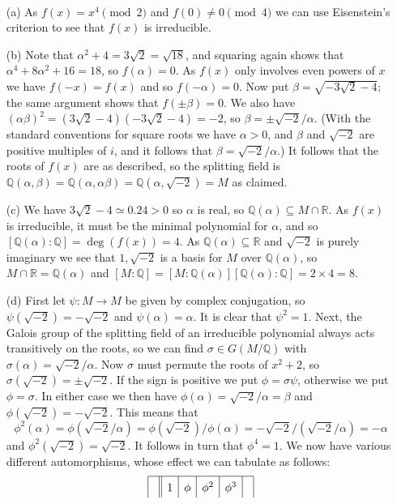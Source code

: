 \documentclass{amsart}
\newcommand{\Q}         {{\mathbb{Q}}}
\newcommand{\R}         {{\mathbb{R}}}
\newcommand{\al}        {\alpha}
\newcommand{\bt}        {\beta}
\newcommand{\sg}        {\sigma}
\newcommand{\tm}        {\times}
\newcommand{\sse}       {\subseteq}
\renewcommand{\:}{\colon}
\newenvironment{solution}{\SolutionInline}{\endSolutionInline}
\theoremstyle{definition}
\renewenvironment{solution}{\SolutionAtEnd}{\endSolutionAtEnd}
\begin{document}
\begin{solution}\ \\
 \begin{itemize}
  \item[(a)] As $f(x)=x^4\pmod{2}$ and $f(0)\neq 0\pmod{4}$ we can use
   Eisenstein's criterion to see that $f(x)$ is irreducible.
  \item[(b)] Note that $\al^2+4=3\sqrt{2}=\sqrt{18}$, and squaring
   again shows that $\al^4+8\al^2+16=18$, so $f(\al)=0$.  As $f(x)$
   only involves even powers of $x$ we have $f(-x)=f(x)$ and so
   $f(-\al)=0$.  Now put $\bt=\sqrt{-3\sqrt{2}-4}$; the same argument
   shows that $f(\pm\bt)=0$.  We also have
   $(\al\bt)^2=(3\sqrt{2}-4)(-3\sqrt{2}-4)=-2$, so
   $\bt=\pm\sqrt{-2}/\al$.  (With the standard conventions for square
   roots we have $\al>0$, and $\bt$ and $\sqrt{-2}$ are positive
   multiples of $i$, and it follows that $\bt=\sqrt{-2}/\al$.)  It
   follows that the roots of $f(x)$ are as described, so the splitting
   field is $\Q(\al,\bt)=\Q(\al,\al\bt)=\Q(\al,\sqrt{-2})=M$ as
   claimed.
  \item[(c)] We have $3\sqrt{2}-4\simeq 0.24>0$ so $\al$ is real, so
   $\Q(\al)\sse M\cap\R$.  As $f(x)$ is irreducible, it must be the
   minimal polynomial for $\al$, and so $[\Q(\al):\Q]=\deg(f(x))=4$.
   As $\Q(\al)\sse\R$ and $\sqrt{-2}$ is purely imaginary we see that
   $1,\sqrt{-2}$ is a basis for $M$ over $\Q(\al)$, so
   $M\cap\R=\Q(\al)$ and $[M:\Q]=[M:\Q(\al)][\Q(\al):\Q]=2\tm 4=8$.
  \item[(d)] First let $\psi\:M\to M$ be given by complex conjugation,
   so $\psi(\sqrt{-2})=-\sqrt{-2}$ and $\psi(\al)=\al$.  It is clear
   that $\psi^2=1$.  Next, the Galois group of the splitting field of
   an irreducible polynomial always acts transitively on the roots, so
   we can find $\sg\in G(M/\Q)$ with $\sg(\al)=\sqrt{-2}/\al$.  Now
   $\sg$ must permute the roots of $x^2+2$, so
   $\sg(\sqrt{-2})=\pm\sqrt{-2}$.  If the sign is positive we put
   $\phi=\sg\psi$, otherwise we put $\phi=\sg$.  In either case we
   then have $\phi(\al)=\sqrt{-2}/\al=\bt$ and
   $\phi(\sqrt{-2})=-\sqrt{-2}$.  This means that 
   \[ \phi^2(\al)=\phi(\sqrt{-2}/\al)=\phi(\sqrt{-2})/\phi(\al) = 
       -\sqrt{-2}/(\sqrt{-2}/\al) = -\al
   \]
   and $\phi^2(\sqrt{-2})=\sqrt{-2}$.  It follows in turn that
   $\phi^4=1$.  We now have various different automorphisms, whose
   effect we can tabulate as follows:
   \[ \renewcommand{\arraystretch}{1.5}
      \begin{array}{|c||c|c|c|c|c|c|c|c|} \hline
       & 1 & \phi & \phi^2 & \phi^3 &

\end{array}\]
\end{itemize}
\end{solution}
\end{document}
